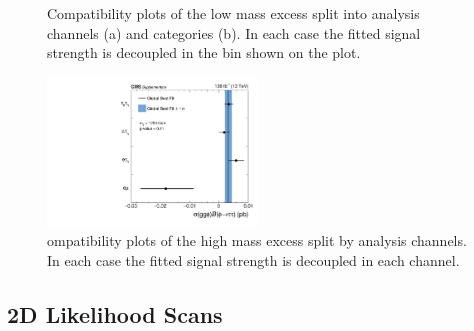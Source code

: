 \begin{figure}[!hbtp]
\centering
\caption{Compatibility plots of the low mass excess split into analysis channels (a) and categories (b). In each case the fitted signal strength is decoupled in the bin shown on the plot.}
\label{fig:low_mass_compatibility}
\end{figure}

\begin{figure}[!hbtp]
\centering
    \includegraphics[width=0.5\textwidth]{Figures/ccc_fit_result_mH1200_per-channel.pdf}
\caption{ompatibility plots of the high mass excess split by analysis channels. In each case the fitted signal strength is decoupled in each channel.}
\label{fig:high_mass_compatibility}
\end{figure}

\subsection{2D Likelihood Scans}

